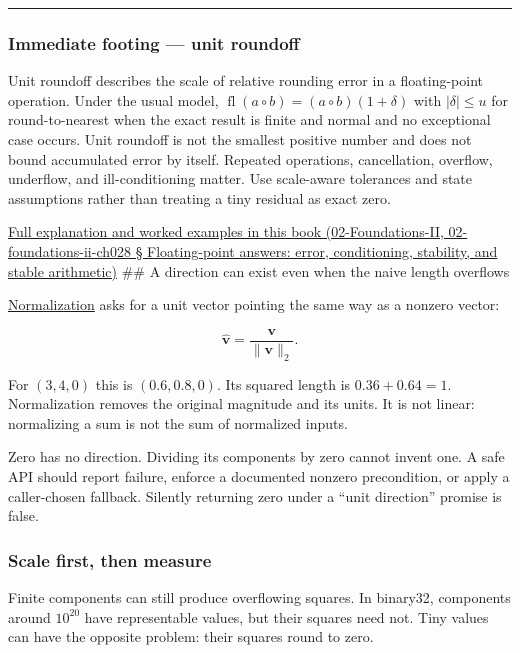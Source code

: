\begin{center}\rule{0.5\linewidth}{0.5pt}\end{center}

\subsubsection{Immediate footing --- unit roundoff}\label{immediate-footing-unit-roundoff}

Unit roundoff describes the scale of relative rounding error in a floating-point operation. Under the usual model, \(\operatorname{fl}(a\circ b)=(a\circ b)(1+\delta)\) with \(|\delta|\le u\) for round-to-nearest when the exact result is finite and normal and no exceptional case occurs. Unit roundoff is not the smallest positive number and does not bound accumulated error by itself. Repeated operations, cancellation, overflow, underflow, and ill-conditioning matter. Use scale-aware tolerances and state assumptions rather than treating a tiny residual as exact zero.

\href{}{Full explanation and worked examples in this book (02-Foundations-II, 02-foundations-ii-ch028 § Floating-point answers: error, conditioning, stability, and stable arithmetic)} \#\# A direction can exist even when the naive length overflows

\hyperref[01-foundations-i-ch017]{Normalization} asks for a unit vector pointing the same way as a nonzero vector:

\[
\widehat{\mathbf v}=\frac{\mathbf v}{\|\mathbf v\|_2}.
\]

For \((3,4,0)\) this is \((0.6,0.8,0)\). Its squared length is \(0.36+0.64=1\). Normalization removes the original magnitude and its units. It is not linear: normalizing a sum is not the sum of normalized inputs.

Zero has no direction. Dividing its components by zero cannot invent one. A safe API should report failure, enforce a documented nonzero precondition, or apply a caller-chosen fallback. Silently returning zero under a ``unit direction'' promise is false.

\subsubsection{Scale first, then measure}\label{scale-first-then-measure}

Finite components can still produce overflowing squares. In binary32, components around \(10^{20}\) have representable values, but their squares need not. Tiny values can have the opposite problem: their squares round to zero.

